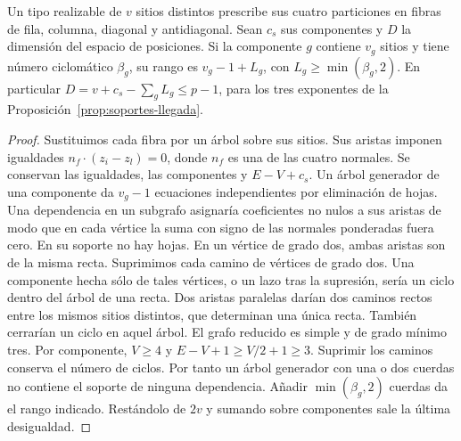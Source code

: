 \begin{lema}\label{lem:rango-llegada}
Un tipo realizable de \(v\) sitios distintos prescribe sus cuatro particiones en fibras de fila,
columna, diagonal y antidiagonal. Sean \(c_s\) sus componentes y \(D\) la dimensión del espacio
de posiciones. Si la componente \(g\) contiene \(v_g\) sitios y tiene número ciclomático
\(\beta_g\), su rango es \(v_g-1+L_g\), con \(L_g\ge\min(\beta_g,2)\).
En particular \(D=v+c_s-\sum_gL_g\le p-1\), para los tres exponentes de la
Proposición~\ref{prop:soportes-llegada}.
\end{lema}
\begin{proof}
Sustituimos cada fibra por un árbol sobre sus sitios. Sus aristas imponen igualdades
\(n_f\cdot(z_i-z_l)=0\), donde \(n_f\) es una de las cuatro normales. Se conservan las
igualdades, las componentes y \(E-V+c_s\). Un árbol generador de una componente da
\(v_g-1\) ecuaciones independientes por eliminación de hojas. Una dependencia en un
subgrafo asignaría coeficientes no nulos a sus aristas de modo que en cada vértice la
suma con signo de las normales ponderadas fuera cero. En su soporte no hay hojas.
En un vértice de grado dos, ambas aristas son de la misma recta. Suprimimos cada camino
de vértices de grado dos. Una componente hecha sólo de tales vértices, o un lazo tras la
supresión, sería un ciclo dentro del árbol de una recta. Dos aristas paralelas darían dos
caminos rectos entre los mismos sitios distintos, que determinan una única recta. También
cerrarían un ciclo en aquel árbol. El grafo reducido es simple y de grado mínimo tres.
Por componente, \(V\ge4\) y \(E-V+1\ge V/2+1\ge3\). Suprimir los caminos conserva el
número de ciclos. Por tanto un árbol generador con una o dos cuerdas no contiene el soporte
de ninguna dependencia. Añadir \(\min(\beta_g,2)\) cuerdas da el rango indicado. Restándolo
de \(2v\) y sumando sobre componentes sale la última desigualdad.
\end{proof}

